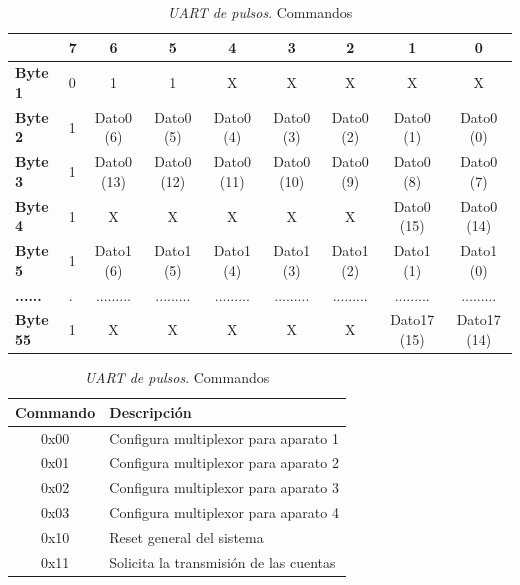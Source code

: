 \begin{table}[h]
                \label{tab:FPGAUartOver}
                \begin{tabularx}{\textwidth}{|l|X|c|c|c|c|c|c|c|}
                    \hline
                    \rowcolor[HTML]{C0C0C0} 
                    \multicolumn{1}{|r|}{\textbf{Bit}}    	 & 7 & 6           & 5 		& 4 	      & 3 	    & 2 	 & 1           & 0 	     	\\ \hline
                    \cellcolor[HTML]{C0C0C0}\textbf{Byte 1}  & 0 & 1           & 1  	& X	      & X	    & X	  	 & X	       & X	     	\\ \hline
                    \cellcolor[HTML]{C0C0C0}\textbf{Byte 2}  & 1 & Dato0 (6)   & Dato0 (5) 	& Dato0 (4)   & Dato0 (3)   & Dato0 (2)  & Dato0 (1)   & Dato0 (0)  	\\ \hline
                    \cellcolor[HTML]{C0C0C0}\textbf{Byte 3}  & 1 & Dato0 (13)  & Dato0 (12)	& Dato0 (11)  & Dato0 (10)  & Dato0 (9)  & Dato0 (8)   & Dato0 (7)  	\\ \hline
                    \cellcolor[HTML]{C0C0C0}\textbf{Byte 4}  & 1 & X	   & X	 	& X	      & X	    & X		 & Dato0 (15)  & Dato0 (14)	\\ \hline
                    \cellcolor[HTML]{C0C0C0}\textbf{Byte 5}  & 1 & Dato1 (6)   & Dato1 (5) 	& Dato1 (4)   & Dato1 (3)   & Dato1 (2)  & Dato1 (1)   & Dato1 (0)  	\\ \hline
                    \cellcolor[HTML]{C0C0C0}\textbf{......}  & . & .........   & ......... 	& .........   & .........   & .........  & .........   & .........  	\\ \hline
                    \cellcolor[HTML]{C0C0C0}\textbf{Byte 55} & 1 & X	   & X	 	& X	      & X	    & X		 & Dato17 (15) & Dato17 (14)	\\ \hline
                \end{tabularx}
                \caption{\emph{UART de pulsos}. Palabra de cuentas}
                \label{tab:FPGAUartCont}
                \begin{tabularx}{\hsize}{|c|X|}
                    \hline
                    \rowcolor[HTML]{C0C0C0} 
                    Commando & Descripción                            \\\hline
                    0x00     & Configura multiplexor para aparato 1   \\\hline
                    0x01     & Configura multiplexor para aparato 2   \\\hline
                    0x02     & Configura multiplexor para aparato 3   \\\hline
                    0x03     & Configura multiplexor para aparato 4   \\\hline
                    0x10     & Reset general del sistema              \\\hline
                    0x11     & Solicita la transmisión de las cuentas \\\hline
                \end{tabularx}
                \caption{\emph{UART de pulsos}. Commandos}
                \label{tab:FPGAUartComm}
            \end{table}
